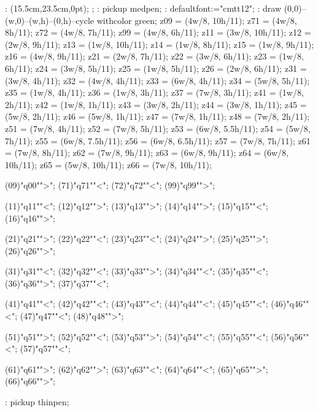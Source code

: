 \MT:
\MTbeginfig(15.5cm,23.5cm,0pt); %
\MTresetpa;
\MT: pickup medpen;
\MT: defaultfont:="cmtt12";
\MT: draw (0,0)--(w,0)--(w,h)--(0,h)--cycle withcolor green;
\MTcode
 z09 = (4w/8, 10h/11);
 z71 = (4w/8, 8h/11);
 z72 = (4w/8, 7h/11);
 z99 = (4w/8, 6h/11);
 z11 = (3w/8, 10h/11);
 z12 = (2w/8, 9h/11);
 z13 = (1w/8, 10h/11);
 z14 = (1w/8, 8h/11);
 z15 = (1w/8, 9h/11);
 z16 = (4w/8, 9h/11);
 z21 = (2w/8, 7h/11);
 z22 = (3w/8, 6h/11);
 z23 = (1w/8, 6h/11);
 z24 = (3w/8, 5h/11);
 z25 = (1w/8, 5h/11);
 z26 = (2w/8, 6h/11);
 z31 = (3w/8, 4h/11);
 z32 = (4w/8, 4h/11);
 z33 = (6w/8, 4h/11);
 z34 = (5w/8, 5h/11);
 z35 = (1w/8, 4h/11);
 z36 = (1w/8, 3h/11);
 z37 = (7w/8, 3h/11);
 z41 = (1w/8, 2h/11);
 z42 = (1w/8, 1h/11);
 z43 = (3w/8, 2h/11);
 z44 = (3w/8, 1h/11);
 z45 = (5w/8, 2h/11);
 z46 = (5w/8, 1h/11);
 z47 = (7w/8, 1h/11);
 z48 = (7w/8, 2h/11);
 z51 = (7w/8, 4h/11);
 z52 = (7w/8, 5h/11);
 z53 = (6w/8, 5.5h/11);
 z54 = (5w/8, 7h/11);
 z55 = (6w/8, 7.5h/11);
 z56 = (6w/8, 6.5h/11);
 z57 = (7w/8, 7h/11);
 z61 = (7w/8, 8h/11);
 z62 = (7w/8, 9h/11);
 z63 = (6w/8, 9h/11);
 z64 = (6w/8, 10h/11);
 z65 = (5w/8, 10h/11);
 z66 = (7w/8, 10h/11);

\MTstate(09)"q00"">";
\MTstate(71)"q71""<";
\MTstate(72)"q72""<";
\MTstate(99)"q99"">";

\MTstate(11)"q11""<";
\MTstate(12)"q12"">";
\MTstate(13)"q13"">";
\MTstate(14)"q14"">";
\MTstate(15)"q15""<";
\MTstate(16)"q16"">";

\MTstate(21)"q21"">";
\MTstate(22)"q22""<";
\MTstate(23)"q23""<";
\MTstate(24)"q24"">";
\MTstate(25)"q25"">";
\MTstate(26)"q26"">";

\MTstate(31)"q31""<";
\MTstate(32)"q32""<";
\MTstate(33)"q33"">";
\MTstate(34)"q34""<";
\MTstate(35)"q35""<";
\MTstate(36)"q36"">";
\MTstate(37)"q37""<";

\MTstate(41)"q41""<";
\MTstate(42)"q42""<";
\MTstate(43)"q43""<";
\MTstate(44)"q44""<";
\MTstate(45)"q45""<";
\MTstate(46)"q46""<";
\MTstate(47)"q47""<";
\MTstate(48)"q48"">";

\MTstate(51)"q51"">";
\MTstate(52)"q52""<";
\MTstate(53)"q53"">";
\MTstate(54)"q54""<";
\MTstate(55)"q55""<";
\MTstate(56)"q56""<";
\MTstate(57)"q57""<";

\MTstate(61)"q61"">";
\MTstate(62)"q62"">";
\MTstate(63)"q63""<";
\MTstate(64)"q64""<";
\MTstate(65)"q65"">";
\MTstate(66)"q66"">";

\MT: pickup thinpen;


